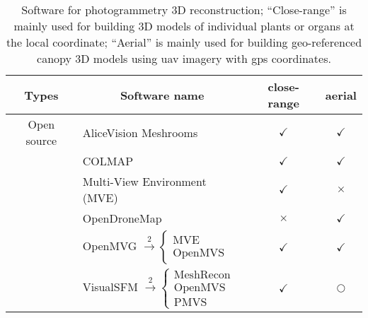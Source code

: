 \begin{table}[htb]
  \caption[Softwares for photogrammetry 3D reconstruction]{Software for photogrammetry 3D reconstruction; ``Close-range'' is mainly used for building 3D models of individual plants or organs at the local coordinate; ``Aerial'' is mainly used for building geo-referenced canopy 3D models using \gls{uav} imagery with \gls{gps} coordinates.}
  \label{tbl:int1}
    \begin{center}
      \begin{threeparttable}
      \begin{tabular*}{\linewidth}{@{\extracolsep{\fill}} clcc}
        \hline
        \multicolumn{1}{c}{\textbf{Types}} & \multicolumn{1}{c}{\textbf{Software name}}                                                                      & \textbf{close-range} & \textbf{aerial}     \\ \hline
        Open source                        & AliceVision Meshrooms                                                                                           & $\checkmark$         & $\checkmark$        \\
                                           & COLMAP                                                                                                          & $\checkmark$         & $\checkmark$        \\
                                           & Multi-View Environment (MVE)                                                                                    & $\checkmark$         & $\times$            \\
                                           & OpenDroneMap\tnote{1}                                                                                           & $\times$             & $\checkmark$        \\
                                           & OpenMVG $\stackrel{2}{\rightarrow} \begin{cases} \text{MVE} \\ \text{OpenMVS} \end{cases}$                      & $\checkmark$         & $\checkmark$        \\
                                           & VisualSFM $\stackrel{2}{\rightarrow} \begin{cases}\text{MeshRecon}\\ \text{OpenMVS} \\ \text{PMVS} \end{cases}$ & $\checkmark$         & $\bigcirc$\tnote{3} \\

\end{tabular*}
\end{threeparttable}
\end{center}
\end{table}
